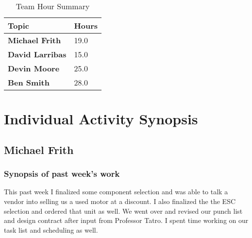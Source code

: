 \documentclass[12pt,compsoc]{IEEEtran}
\begin{document}
	\begin{table}[ht]
		\renewcommand{\arraystretch}{1.3}
		\caption{Team Hour Summary}
		
		\label{Team Hour Summary}
		
		\centering
		\begin{tabular}{p{5cm}|p{1.5cm}}
		\hline
		{\bfseries 	Topic} 								&{\bfseries Hours}		\\
		\hline\hline
					{\bfseries Michael Frith}  			& 19.0					\\
					{\bfseries David Larribas} 			& 15.0					\\
					{\bfseries Devin Moore}				& 25.0					\\
					{\bfseries Ben Smith}  				& 28.0					\\		
					\hline
		\end{tabular}
	\end{table}

\section{Individual Activity Synopsis}
	\subsection{Michael Frith}

	\subsubsection*{Synopsis of past week's work}
        This past week I finalized some component selection and was able to talk a vendor into selling 
        us a used motor at a discount. I also finalized the the ESC selection and ordered that unit 
        as well. We went over and revised our punch list and design contract after input from Professor 
        Tatro. I spent time working on our task list and scheduling as well.
\end{document}
